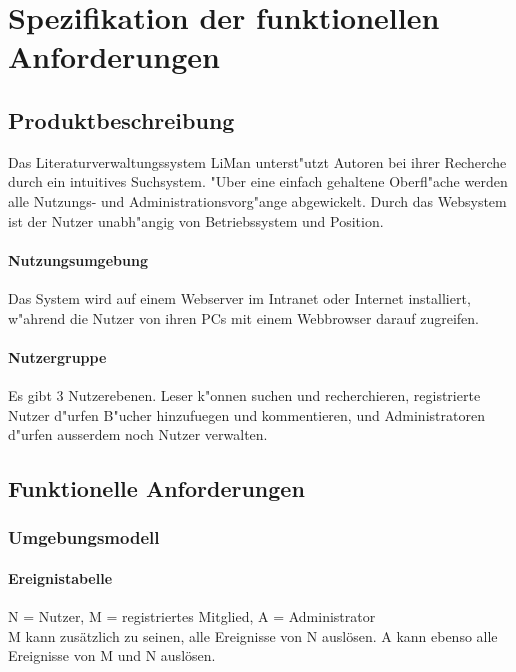 \chapter{Spezifikation der funktionellen Anforderungen}
\section{Produktbeschreibung}
Das Literaturverwaltungssystem LiMan unterst"utzt Autoren bei
ihrer Recherche durch ein intuitives Suchsystem. "Uber eine einfach
gehaltene Oberfl"ache werden alle Nutzungs- und Administrationsvorg"ange
abgewickelt. Durch das Websystem ist der Nutzer unabh"angig von Betriebssystem 
und Position.
\subsubsection*{Nutzungsumgebung}
Das System wird auf einem Webserver im Intranet oder 
Internet installiert, w"ahrend die Nutzer von ihren PCs mit
einem Webbrowser darauf zugreifen.
\subsubsection*{Nutzergruppe}
Es gibt 3 Nutzerebenen. Leser k"onnen suchen und recherchieren,
registrierte Nutzer d"urfen B"ucher hinzufuegen und kommentieren, und Administratoren
d"urfen ausserdem noch Nutzer verwalten.


\section{Funktionelle Anforderungen}
\subsection{Umgebungsmodell}

\subsubsection{Ereignistabelle}
N = Nutzer, M = registriertes Mitglied, A = Administrator \\
M kann zusätzlich zu seinen, alle Ereignisse von N auslösen. A kann ebenso alle Ereignisse von M und N auslösen.

